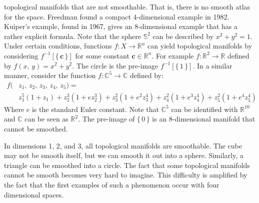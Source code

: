 \documentclass{article}
\theoremstyle{plain}
\theoremstyle{normal}
\begin{document}
        topological manifolds that are not smoothable. That is, there is no
        smooth atlas for the space. Freedman found a compact 4-dimensional
        example in 1982. Kuiper's example, found in 1967, gives an 8-dimensional
        example that has a rather explicit formula. Note that the sphere
        $\mathbb{S}^{2}$ can be described by $x^{2}+y^{2}=1$. Under certain
        conditions, functions $f:X\rightarrow\mathbb{R}^{n}$ can yield
        topological manifolds by considering $f^{-1}[\{\,\mathbf{c}\,\}]$ for
        some constant $\mathbf{c}\in\mathbb{R}^{n}$. For example
        $f:\mathbb{R}^{2}\rightarrow\mathbb{R}$ defined by
        $f(x,\,y)=x^{2}+y^{2}$. The circle is the pre-image
        $f^{-1}[\{\,1\,\}]$. In a similar manner, consider the function
        $f:\mathbb{C}^{5}\rightarrow\mathbb{C}$ defined by:
        \begin{align}
            \nonumber
            f(&z_{1},\,z_{2},\,z_{3},\,z_{4},\,z_{5})
                =\\
                &z_{1}^{5}(1+z_{1})
                +z_{2}^{3}(1+ez_{2}^{3})
                +z_{3}^{2}(1+e^{2}z_{3}^{4})
                +z_{4}^{2}(1+e^{3}z_{4}^{4})
                +z_{5}^{2}(1+e^{4}z_{5}^{4})
        \end{align}
        Where $e$ is the standard Euler constant.
        Note that $\mathbb{C}^{5}$ can be identified with $\mathbb{R}^{10}$
        and $\mathbb{C}$ can be seen as $\mathbb{R}^{2}$. The pre-image of
        $\{\,0\,\}$ is an 8-dimensional manifold that cannot be smoothed.
        \par\hfill\par
        In dimensions 1, 2, and 3, all topological manifolds are smoothable.
        The cube may not be smooth itself, but we can smooth it out into a
        sphere. Similarly, a triangle can be smoothed into a circle. The fact
        that some topological manifolds cannot be smooth becomes very hard to
        imagine. This difficulty is amplified by the fact that the first
        examples of such a phenomenon occur with four dimensional spaces.
\end{document}
